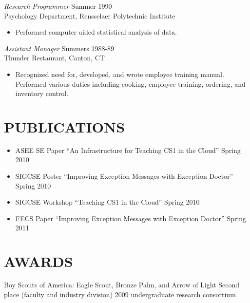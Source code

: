 \documentclass[line,margin]{res}
\begin{document}
\begin{resume}
                {\sl Research Programmer} \hfill            Summer 1990 \\
                Psychology Department, Rensselaer Polytechnic 
                Institute 
                 \begin{itemize}  \itemsep -2pt %
                 \item Performed computer aided statistical analysis 
                    of data. 
                 \end{itemize} 
                {\sl Assistant Manager} \hfill        Summers 1988-89 \\
                Thunder Restaurant, Canton, CT
                  \begin{itemize}
                   \item Recognized need for, developed, and wrote 
                    employee training manual. Performed various 
                    duties including cooking, employee training, 
                    ordering, and inventory control. 
                   \end{itemize} 
 
\section{PUBLICATIONS} 
\begin{itemize}
\item ASEE SE Paper ``An Infrastructure for Teaching CS1 in the Cloud'' Spring 2010
\item SIGCSE Poster ``Improving Exception Messages with Exception Doctor'' Spring 2010
\item SIGCSE Workshop ``Teaching CS1 in the Cloud'' Spring 2010
\item FECS Paper ``Improving Exception Messages with Exception Doctor'' Spring 2011
\end{itemize}
\section{AWARDS}
Boy Scouts of America: Eagle Scout, Bronze Palm, and Arrow of Light
Second place (faculty and industry division) 2009 undergraduate research consortium

\end{resume}
\end{document}
